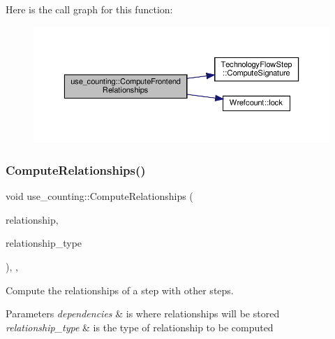 Here is the call graph for this function\+:
\nopagebreak
\begin{figure}[H]
\begin{center}
\leavevmode
\includegraphics[width=350pt]{d4/d2e/classuse__counting_a8a110f0d3c446c00cbdbe88a465e24d8_cgraph}
\end{center}
\end{figure}
\mbox{\label{classuse__counting_ae50eb0e5cc8c9e0a5c6a630ac6765f59}} 
\subsubsection{\texorpdfstring{Compute\+Relationships()}{ComputeRelationships()}}
{\footnotesize\ttfamily void use\+\_\+counting\+::\+Compute\+Relationships (\begin{DoxyParamCaption}\item[{\hyperlink{classDesignFlowStepSet}{Design\+Flow\+Step\+Set} \&}]{relationship,  }\item[{const \hyperlink{classDesignFlowStep_a723a3baf19ff2ceb77bc13e099d0b1b7}{Design\+Flow\+Step\+::\+Relationship\+Type}}]{relationship\+\_\+type }\end{DoxyParamCaption})\hspace{0.3cm}{\ttfamily [override]}, {\ttfamily [private]}, {\ttfamily [virtual]}}



Compute the relationships of a step with other steps. 


\begin{DoxyParams}{Parameters}
{\em dependencies} & is where relationships will be stored \\
\hline
{\em relationship\+\_\+type} & is the type of relationship to be computed \\
\hline
\end{DoxyParams}



